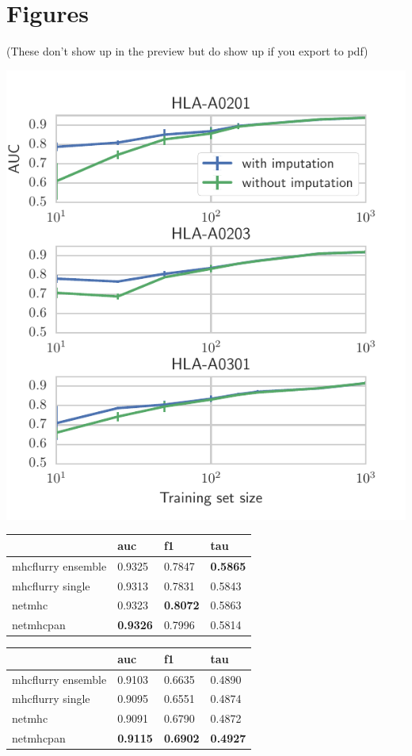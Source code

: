 \section{Figures}
(These don't show up in the preview but do show up if you export to pdf)

\includegraphics{figures/impute_comparison.pdf}



\begin{tabular}{llll}
\toprule
{} &              auc &               f1 &              tau \\
\midrule
mhcflurry ensemble &           0.9325 &           0.7847 &  \textbf{0.5865} \\
mhcflurry single   &           0.9313 &           0.7831 &           0.5843 \\
netmhc             &           0.9323 &  \textbf{0.8072} &           0.5863 \\
netmhcpan          &  \textbf{0.9326} &           0.7996 &           0.5814 \\
\bottomrule
\end{tabular}

\begin{tabular}{llll}
\toprule
{} &              auc &               f1 &              tau \\
\midrule
mhcflurry ensemble &           0.9103 &           0.6635 &           0.4890 \\
mhcflurry single   &           0.9095 &           0.6551 &           0.4874 \\
netmhc             &           0.9091 &           0.6790 &           0.4872 \\
netmhcpan          &  \textbf{0.9115} &  \textbf{0.6902} &  \textbf{0.4927} \\
\bottomrule
\end{tabular}

